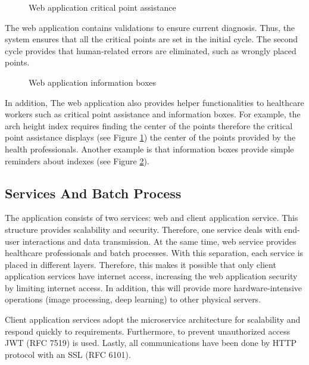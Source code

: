 \begin{figure}[htbp]
\centering
{}
\caption{Web application critical point assistance}
\label{fig:WebApplicationCriticalPointAssistance}
\end{figure}

The web application contains validations to ensure current diagnosis. Thus, the system ensures that all the critical points are set in the initial cycle. The second cycle provides that human-related errors are eliminated, such as wrongly placed points. 

\begin{figure}[htbp]
\centering
{}
\caption{Web application information boxes}
\label{fig:WebApplicationInformationBoxes}
\end{figure}

In addition, The web application also provides helper functionalities to healthcare workers such as critical point assistance and information boxes. For example, the arch height index requires finding the center of the points therefore the critical point assistance displays (see Figure \ref{fig:WebApplicationCriticalPointAssistance}) the center of the points provided by the health professionals. Another example is that information boxes provide simple reminders about indexes (see Figure \ref{fig:WebApplicationInformationBoxes}).

\subsection{Services And Batch Process} \label{sec:StudyIServicesAndBatchProcess}
The application consists of two services: web and client application service. This structure provides scalability and security. Therefore, one service deals with end-user interactions and data transmission. At the same time, web service provides healthcare professionals and batch processes. With this separation, each service is placed in different layers. Therefore, this makes it possible that only client application services have internet access, increasing the web application security by limiting internet access. In addition, this will provide more hardware-intensive operations (image processing, deep learning) to other physical servers. 

Client application services adopt the microservice architecture for scalability and respond quickly to requirements. Furthermore, to prevent unauthorized access JWT (RFC 7519) is used. Lastly, all communications have been done by HTTP protocol with an SSL (RFC 6101). 

